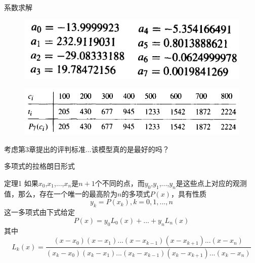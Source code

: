 \documentclass[UTF8]{ctexbeamer}
\begin{document}
\begin{frame}{系数求解}

  \begin{figure}
    \centering
    \includegraphics[width=.4\textwidth{}]{record-sol.png}
  \end{figure}

  \begin{figure}
    \centering
    \includegraphics[width=.7\textwidth{}]{record-comp.png}
  \end{figure}

  考虑第3章提出的评判标准...该模型真的是最好的吗？
  
\end{frame}

\begin{frame}{多项式的拉格朗日形式}

  \begin{block}{定理1}
    如果$x_0$,$x_1$,...,$x_n$是$n+1$个不同的点，而$y_0$,$y_1$,...,$y_n$是这些点上对应的观测值，那么，存在一个唯一的最高阶为$n$的多项式$P(x)$，具有性质
    \[
    y_k = P(x_k), k = 0, 1, ..., n
    \]
    这一多项式由下式给定
    \[
    P(x) = y_0L_0(x) + ... + y_nL_n(x)
    \]
    其中
    \[
    L_k(x) = \frac{(x-x_0)(x-x_1)...(x-x_{k-1})(x-x_{k+1})...(x-x_n)}{(x_k-x_0)(x_k-x_1)...(x_k-x_{k-1})(x_k-x_{k+1})...(x_k-x_n)}
    \]

  \end{block}
  
\end{frame}
\end{document}
